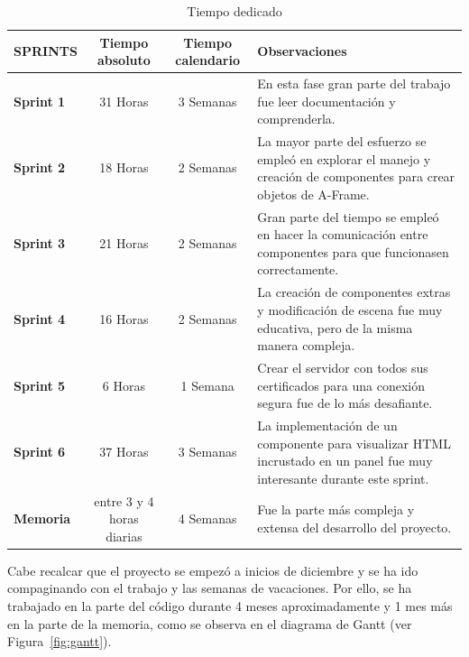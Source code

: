 \documentclass[a4paper, 12pt]{book}
\begin{document}
\begin{table}[hbtp]
\centering
\begin{tabular}{|l|c|c|p{6cm}|}
\hline
\textbf{SPRINTS} & \textbf{Tiempo absoluto} & \textbf{Tiempo calendario} & \textbf{Observaciones} \\
\hline
\textbf{Sprint 1} & 31 Horas & 3 Semanas & En esta fase gran parte del trabajo fue leer documentación y comprenderla.\\
\hline
\textbf{Sprint 2} & 18 Horas & 2 Semanas & La mayor parte del esfuerzo se empleó en explorar el manejo y creación de componentes para crear objetos de A-Frame.\\
\hline
\textbf{Sprint 3} & 21 Horas & 2 Semanas & Gran parte del tiempo se empleó en hacer la comunicación entre componentes para que funcionasen correctamente.\\
\hline
\textbf{Sprint 4} & 16 Horas & 2 Semanas & La creación de componentes extras y modificación de escena fue muy educativa, pero de la misma manera compleja.\\
\hline
\textbf{Sprint 5} & 6 Horas & 1 Semana & Crear el servidor con todos sus certificados para una conexión segura fue de lo más desafiante.\\
\hline
\textbf{Sprint 6} & 37 Horas & 3 Semanas & La implementación de un componente para visualizar HTML incrustado en un panel fue muy interesante durante este sprint.\\
\hline
\textbf{Memoria} & entre 3 y 4 horas diarias & 4 Semanas & Fue la parte más compleja y extensa del desarrollo del proyecto.\\
\hline
\end{tabular}
\caption{Tiempo dedicado}
\label{tab:tiempo_dedicado}
\end{table}

Cabe recalcar que el proyecto se empezó a inicios de diciembre y se ha ido compaginando con el trabajo y las semanas de vacaciones. Por ello, se ha trabajado en la parte del código durante 4 meses aproximadamente y 1 mes más en la parte de la memoria, como se observa en el diagrama de Gantt (ver Figura~\ref{fig:gantt}).
\end{document}
